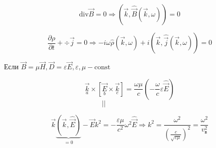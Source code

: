 \documentclass[12pt, a4paper]{report}
\begin{document}
\[ \mathrm{div} \vec{B} = 0 \Rightarrow (\vec{k },\hat{\vec{B}} ( \vec{k }, \omega)) = 0    \] 

\[ \frac{ \partial \rho }{ \partial t } + \mathrm{ \div  } \vec{ j }  = 0 \Rightarrow - i \omega \hat{ \rho } ( \vec{k }, \omega) + i ( \vec{k }, \hat{\vec{j}} ( \vec{k }, \omega) ) = 0      \] 

Если \( \vec{B} = \mu \vec{H } , \vec{D } = \varepsilon \vec{ E } , \varepsilon , \mu  - \mathrm{const}   \)

\[ \underset{a}{\vec{k}} \times \left[ \underset{b}{\vec{E}} \times \underset{c}{\vec{k}} \right] = \frac{\omega \mu}{c }  \left( - \frac{\omega}{ c } \varepsilon \hat{\vec{E}}  \right)
\] 
\( \quad \quad \quad \quad \quad \quad \quad \quad \quad \quad \quad \quad \quad \quad || \) 

\[ \vec{k } \underbrace{( \vec{k }, \hat{\vec{E }})}_{=0} - \hat{ \vec{ E } } k ^2 = - \frac{\varepsilon \mu }{c ^2 } \omega ^2 \hat{\vec{E }} \Rightarrow k ^2 = \frac{ \omega ^2 }{\left( \frac{c}{\sqrt{\varepsilon \mu}}      \right) ^2} = \frac{\omega ^2 }{v ^2 _{\text{в} } }       \] 



\ifdefined\mainfile
\else
    
\end{document}
